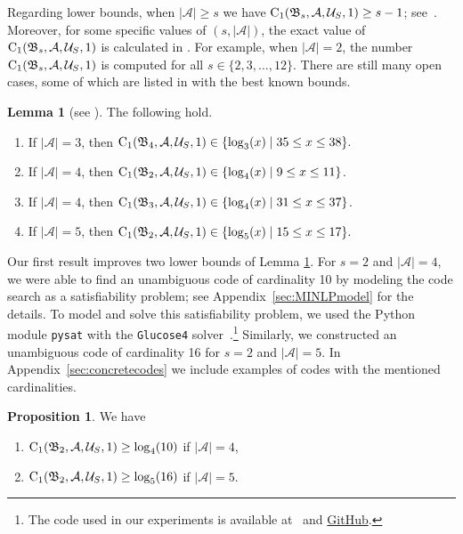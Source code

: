 \documentclass[11pt,a4paper]{article}
\theoremstyle{definition}
\newtheorem{proposition}[theorem]{Proposition}
\newtheorem{lemma}[theorem]{Lemma}
\newcommand{\mA}{\mathcal{A}}
\newcommand{\mU}{\mathcal{U}}
\newcommand{\CC}{\textnormal{C}}
\begin{document}
Regarding lower bounds,
when $|\mA| \ge s$ we have
$\CC_1(\mathfrak{B}_s,\mA,\mU_S,1) \ge s-1$; see~\cite{beemer2023network}. Moreover, for some specific values of $(s,|\mA|)$, the exact value of $\CC_1(\mathfrak{B}_s,\mA,\mU_S,1)$ is calculated in \cite{kurz2022capacity}. For example, when $|\mA|=2$, the number $\CC_1(\mathfrak{B}_s,\mA,\mU_S,1)$ is computed for all $s\in \{2,3,\ldots,12\}.$ There are still many open cases, some of which are listed in \cite[Table~4]{kurz2022capacity} with the best known bounds.
\begin{lemma}[see \cite{kurz2022capacity}]
\label{lem:kurz22}
The following hold.
\begin{enumerate}
    \item If $\lvert \mA \rvert =3$, then $\CC_1(\mathfrak{B}_4,\mA,\mU_S,1) \in \{\log_3(x) \mid 35 \le x \le 38\}.$
    \item If $\lvert \mA \rvert = 4$, then $\CC_1(\mathfrak{B}_2,\mA,\mU_S,1) \in \{\log_4(x) \mid 9 \le x \le 11\}$.
    \item If $\lvert \mA \rvert=4$, then $\CC_1(\mathfrak{B}_3,\mA,\mU_S,1) \in \{\log_4(x) \mid 31 \le x \le 37\}$. 
    \item If $\lvert \mA \rvert=5$, then $\CC_1(\mathfrak{B}_2,\mA,\mU_S,1) \in \{\log_5(x) \mid 15 \le x \le 17\}.$
\end{enumerate}
\end{lemma}

Our first result improves
two lower bounds of Lemma \ref{lem:kurz22}.
For $s=2$ and $|\mA|=4$, we were able to find an unambiguous code of cardinality 10 
by modeling the code search as a satisfiability problem; see Appendix~\ref{sec:MINLPmodel} for the details.
To model and solve this satisfiability problem, we used the Python module \texttt{pysat} with the \texttt{Glucose4} solver~\cite{glucose}.\footnote{The code used in our experiments is available at~\cite{zenodo} and \href{https://github.com/christopherhojny/supplement_network_codes}{GitHub}.}
Similarly, we constructed an unambiguous code of cardinality 16 for $s=2$ and $|\mA|=5$.
In Appendix~\ref{sec:concretecodes} we include examples of codes with the mentioned cardinalities.

\begin{proposition}
\label{prop:familyB}
We have 
\begin{enumerate}
    \item $\CC_1(\mathfrak{B}_2,\mA,\mU_S,1) \ge \log_4(10)$ if $\lvert \mA \rvert=4$, 
    \item $\CC_1(\mathfrak{B}_2,\mA,\mU_S,1) \ge \log_5(16)$ if $\lvert \mA \rvert=5$. 
\end{enumerate}
\end{proposition}
\end{document}
